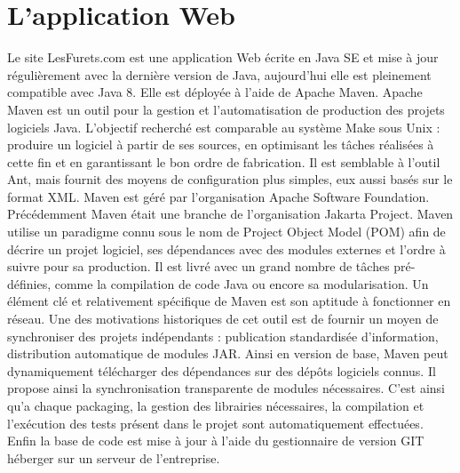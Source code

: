 \section{L'application Web}
Le site LesFurets.com est une application Web écrite en Java SE et mise à jour régulièrement avec la dernière version de Java, aujourd'hui elle est pleinement compatible avec Java 8. Elle est déployée à l'aide de Apache Maven. Apache Maven est un outil pour la gestion et l'automatisation de production des projets logiciels Java. L'objectif recherché est comparable au système Make sous Unix : produire un logiciel à partir de ses sources, en optimisant les tâches réalisées à cette fin et en garantissant le bon ordre de fabrication.
Il est semblable à l'outil Ant, mais fournit des moyens de configuration plus simples, eux aussi basés sur le format XML. Maven est géré par l'organisation Apache Software Foundation. Précédemment Maven était une branche de l'organisation Jakarta Project.
Maven utilise un paradigme connu sous le nom de Project Object Model (POM) afin de décrire un projet logiciel, ses dépendances avec des modules externes et l'ordre à suivre pour sa production. Il est livré avec un grand nombre de tâches pré-définies, comme la compilation de code Java ou encore sa modularisation.
Un élément clé et relativement spécifique de Maven est son aptitude à fonctionner en réseau. Une des motivations historiques de cet outil est de fournir un moyen de synchroniser des projets indépendants : publication standardisée d'information, distribution automatique de modules JAR. Ainsi en version de base, Maven peut dynamiquement télécharger des dépendances sur des dépôts logiciels connus. Il propose ainsi la synchronisation transparente de modules nécessaires. C'est ainsi qu'a chaque packaging, la gestion des librairies nécessaires, la compilation et l'exécution des tests présent dans le projet sont automatiquement effectuées. Enfin la base de code est mise à jour à l'aide du gestionnaire de version GIT héberger sur un serveur de l'entreprise.